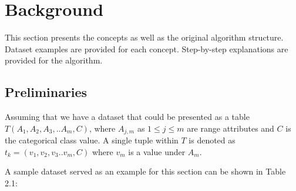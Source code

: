 \chapter{Background}

This section presents the concepts as well as the original algorithm structure. Dataset examples are provided for each concept. Step-by-step explanations are provided for the algorithm.

\section{Preliminaries}

Assuming that we have a dataset that could be presented as a table $T(A_1, A_2, A_3,..A_m, C)$, where $A_{j,m}$ as $1 \leq j \leq m$ are range attributes and $C$ is the categorical class value. A single tuple within $T$ is denoted as $t_k = (v_1,v_2,v_3..v_m,C)$ where $v_m$ is a value under $A_m$.

A sample dataset served as an example for this section can be shown in Table 2.1: 

 

